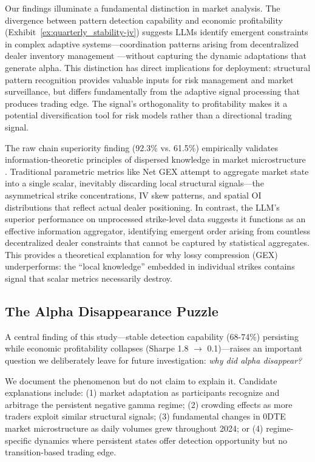 Our findings illuminate a fundamental distinction in market analysis. The divergence between pattern detection capability and economic profitability (Exhibit~\ref{ex:quarterly_stability-jv}) suggests LLMs identify emergent constraints in complex adaptive systems—coordination patterns arising from decentralized dealer inventory management \citep{grossman1988liquidity,garleanu2009demand}—without capturing the dynamic adaptations that generate alpha. This distinction has direct implications for deployment: structural pattern recognition provides valuable inputs for risk management and market surveillance, but differs fundamentally from the adaptive signal processing that produces trading edge. The signal's orthogonality to profitability makes it a potential diversification tool for risk models rather than a directional trading signal.

The raw chain superiority finding (92.3\% vs. 61.5\%) empirically validates information-theoretic principles of dispersed knowledge in market microstructure \citep{hayek1945}. Traditional parametric metrics like Net GEX attempt to aggregate market state into a single scalar, inevitably discarding local structural signals—the asymmetrical strike concentrations, IV skew patterns, and spatial OI distributions that reflect actual dealer positioning. In contrast, the LLM's superior performance on unprocessed strike-level data suggests it functions as an effective information aggregator, identifying emergent order arising from countless decentralized dealer constraints that cannot be captured by statistical aggregates. This provides a theoretical explanation for why lossy compression (GEX) underperforms: the ``local knowledge'' embedded in individual strikes contains signal that scalar metrics necessarily destroy.

\subsection{The Alpha Disappearance Puzzle}

A central finding of this study—stable detection capability (68-74\%) persisting while economic profitability collapses (Sharpe 1.8 $\rightarrow$ 0.1)—raises an important question we deliberately leave for future investigation: \textit{why did alpha disappear?}

We document the phenomenon but do not claim to explain it. Candidate explanations include: (1) market adaptation as participants recognize and arbitrage the persistent negative gamma regime; (2) crowding effects as more traders exploit similar structural signals; (3) fundamental changes in 0DTE market microstructure as daily volumes grew throughout 2024; or (4) regime-specific dynamics where persistent states offer detection opportunity but no transition-based trading edge.

